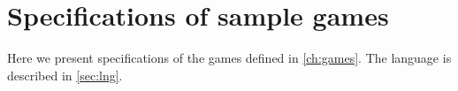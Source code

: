 \chapter{Specifications of sample games} \label{app:games}

Here we present specifications of the games defined in \autoref{ch:games}.
The language is described in \autoref{sec:lng}.

